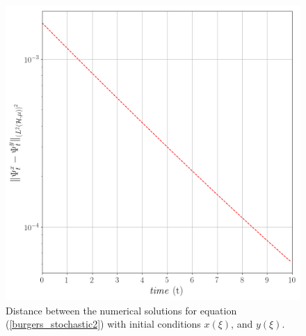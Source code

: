 	\begin{figure}[H]	
	\centering
		\includegraphics[width=.7\textwidth]{burgers_equation/stochastic/numerical_experiments/figures/norms.png}
		\caption{Distance between the numerical solutions for equation (\ref{burgers_stochastic2}) with initial conditions $x(\xi)$, and $y(\xi)$.}
		\label{Continuity}
	\end{figure}
